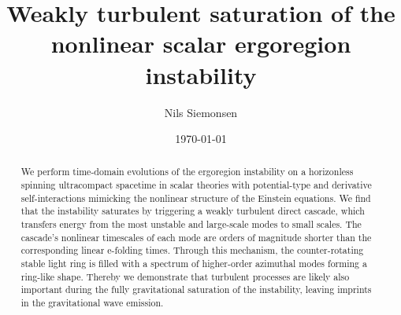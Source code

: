 \documentclass[aps,prl,notitlepage,superscriptaddress,twocolumn]{revtex4-1}
\begin{document}
\title{Weakly turbulent saturation of the nonlinear scalar ergoregion instability}
\author{Nils Siemonsen}





\date{\today}

\begin{abstract}
We perform time-domain evolutions of the ergoregion instability on a horizonless spinning ultracompact spacetime in scalar theories with potential-type and derivative self-interactions mimicking the nonlinear structure of the Einstein equations. We find that the instability saturates by triggering a weakly turbulent direct cascade, which transfers energy from the most unstable and large-scale modes to small scales. The cascade's nonlinear timescales of each mode are orders of magnitude shorter than the corresponding linear e-folding times. Through this mechanism, the counter-rotating stable light ring is filled with a spectrum of higher-order azimuthal modes forming a ring-like shape. Thereby we demonstrate that turbulent processes are likely also important during the fully gravitational saturation of the instability, leaving imprints in the gravitational wave emission.
\end{abstract}

\maketitle
\end{document}

